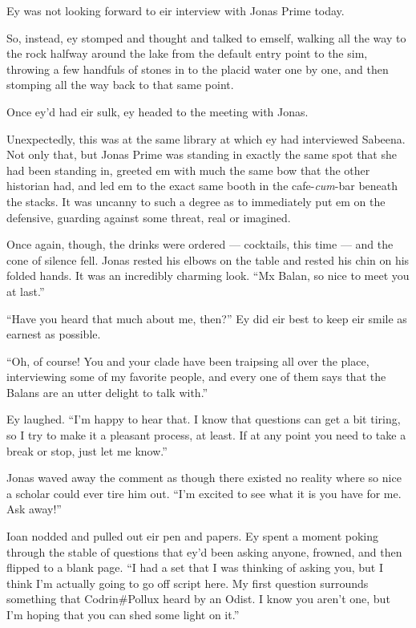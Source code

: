 Ey was not looking forward to eir interview with Jonas Prime today.

So, instead, ey stomped and thought and talked to emself, walking all the way to the rock halfway around the lake from the default entry point to the sim, throwing a few handfuls of stones in to the placid water one by one, and then stomping all the way back to that same point.

Once ey'd had eir sulk, ey headed to the meeting with Jonas.

Unexpectedly, this was at the same library at which ey had interviewed Sabeena. Not only that, but Jonas Prime was standing in exactly the same spot that she had been standing in, greeted em with much the same bow that the other historian had, and led em to the exact same booth in the cafe-\emph{cum}-bar beneath the stacks. It was uncanny to such a degree as to immediately put em on the defensive, guarding against some threat, real or imagined.

Once again, though, the drinks were ordered — cocktails, this time — and the cone of silence fell. Jonas rested his elbows on the table and rested his chin on his folded hands. It was an incredibly charming look. ``Mx Balan, so nice to meet you at last.''

``Have you heard that much about me, then?'' Ey did eir best to keep eir smile as earnest as possible.

``Oh, of course! You and your clade have been traipsing all over the place, interviewing some of my favorite people, and every one of them says that the Balans are an utter delight to talk with.''

Ey laughed. ``I'm happy to hear that. I know that questions can get a bit tiring, so I try to make it a pleasant process, at least. If at any point you need to take a break or stop, just let me know.''

Jonas waved away the comment as though there existed no reality where so nice a scholar could ever tire him out. ``I'm excited to see what it is you have for me. Ask away!''

Ioan nodded and pulled out eir pen and papers. Ey spent a moment poking through the stable of questions that ey'd been asking anyone, frowned, and then flipped to a blank page. ``I had a set that I was thinking of asking you, but I think I'm actually going to go off script here. My first question surrounds something that Codrin\#Pollux heard by an Odist. I know you aren't one, but I'm hoping that you can shed some light on it.''


